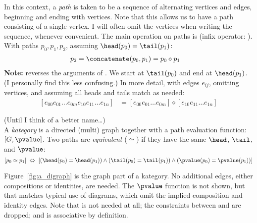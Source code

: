 \documentclass[11pt,openany]{book}
\begin{document}
\begin{definition}[Paths]
In this context, a \textit{path} is taken to be a sequence of
alternating vertices and edges, beginning and ending 
with vertices. 
Note that this allows us to have a path consisting 
of a single vertex.
I will often omit the vertices when writing the sequence,
whenever convenient.
The main operation on paths is \concatenate
(infix operator: \conop).
With paths $p_0,p_1,p_2$,
assuming $\head(p_0) = \tail(p_1)$: 
\begin{align*}
p_2 & = \concatenate(p_0,p_1) = p_0 \diamond p_1
\end{align*}
\textbf{Note:} \concatenate reverses the arguments
of \compose. 
We start at $\tail(p_0)$ and end at 
$\head(p_1)$.
(I personally find this less confusing.)
In more detail, with edges $e_{ij}$,
omitting vertices, 
and assuming all heads and tails match as needed:
\begin{align*}
\left[ e_{00} e_{01} \ldots e_{0m}
e_{10} e_{11} \ldots e_{1n}
 \right]
& = 
\left[ e_{00} e_{01} \ldots e_{0m} \right]
\diamond
\left[ e_{10} e_{11} \ldots e_{1n} \right]
\end{align*}
\end{definition}

\begin{definition}
(Until I think of a better name\ldots)\\
A \textit{kategory} is a directed (multi) graph together with
a path evaluation function: $\left[G, \pvalue\right]$.
Two paths are \textit{equivalent} ($\simeq$) 
if they have the same 
$\head$, $\tail$, and $\pvalue$:
\[
\left[ p_0 \simeq p_1 \right]
\;  \Leftrightarrow \;
\left[
\left( \head(p_0) = \head(p_1) \right)
\wedge
\left( \tail(p_0) = \tail(p_1) \right)
\wedge
\left( \pvalue(p_0) = \pvalue(p_1) \right)
\right]
\]
\end{definition}

Figure~\ref{fig:a_digraph} is the graph part of a kategory.
No additional edges, either compositions or identities, are
needed. 
The $\pvalue$  function is not shown,
but that matches typical
use of diagrams, which omit the implied
composition and identity edges.
Note that \identity is not needed at all;
the constraints between \identity and \compose
are dropped; and \concatenate is associative by definition.

\label{sec:Kategory_from_category}
\end{document}
